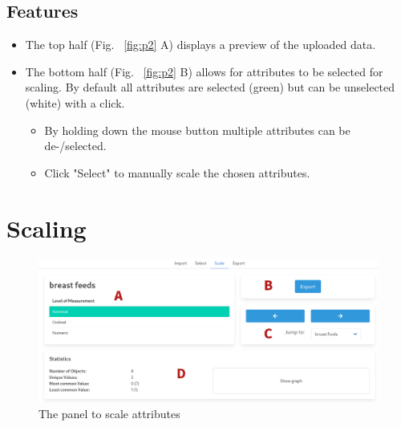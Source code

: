 \documentclass[]{report}
\begin{document}
\subsection{Features}
\begin{itemize}
    \item The top half (Fig. ~\ref{fig:p2} A) displays a preview of the uploaded data.
    \item The bottom half (Fig. ~\ref{fig:p2} B) allows for attributes to be selected for scaling. By default all attributes are selected (green) but can be unselected (white) with a click.
	\begin{itemize}
		\item By holding down the mouse button  multiple attributes can be de-/selected.
		\item Click "Select" to manually scale the chosen attributes.
	\end{itemize}
\end{itemize}

\section{Scaling}
\begin{figure}[H]
	\includegraphics[width=\linewidth]{final_presentation/images/nominal.png}
	\caption{The panel to scale attributes}
	\label{fig:p3}
\end{figure}
\end{document}
